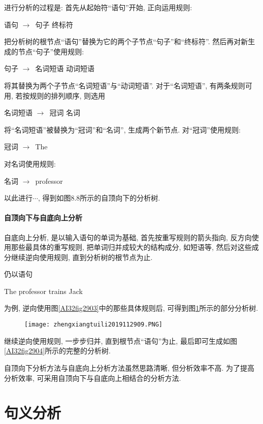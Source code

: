 进行分析的过程是:
    首先从起始符“语句”开始, 正向运用规则:
\begin{center}
    语句 $\rightarrow$\,  句子   终标符
\end{center}
把分析树的根节点“语句”替换为它的两个子节点“句子”和“终标符”.
    然后再对新生成的节点“句子”使用规则:
\begin{center}
    句子 $\rightarrow$\,  名词短语   动词短语
\end{center}
将其替换为两个子节点“名词短语”与“动词短语”.
    对于“名词短语”, 有两条规则可用, 若按规则的排列顺序, 则选用
\begin{center}
    名词短语 $\rightarrow$\,  冠词    名词
\end{center}
将“名词短语”被替换为“冠词”和“名词”, 生成两个新节点. 对“冠词”使用规则:
\begin{center}
    冠词 $\rightarrow$\,  The
\end{center}
对名词使用规则:
\begin{center}
    名词 $\rightarrow$\,  professor
\end{center}
以此进行$\cdots$, 得到如图8.8所示的自顶向下的分析树.
\paragraph{自顶向下与自底向上分析}
自底向上分析, 是以输入语句的单词为基础, 首先按重写规则的箭头指向, 反方向使用那些最具体的重写规则, 把单词归并成较大的结构成分, 如短语等, 然后对这些成分继续逆向使用规则, 直到分析树的根节点为止.

仍以语句
\begin{center}
    The  professor  trains  Jack
\end{center}
为例, 逆向使用图\ref{AI32fig2903}中的那些具体规则后, 可得到图\ref{AI32fig2909}所示的部分分析树.
\begin{figure}[H]
\centering
\texttt{[image: zhengxiangtuili2019112909.PNG]}
\caption{}
\label{AI32fig2909}
\end{figure}

继续逆向使用规则, 一步步归并, 直到根节点“语句”为止, 最后即可生成如图\ref{AI32fig2904}所示的完整的分析树.

自顶向下分析方法与自底向上分析方法虽然思路清晰, 但分析效率不高. 为了提高分析效率, 可采用自顶向下与自底向上相结合的分析方法.

\section{句义分析}

